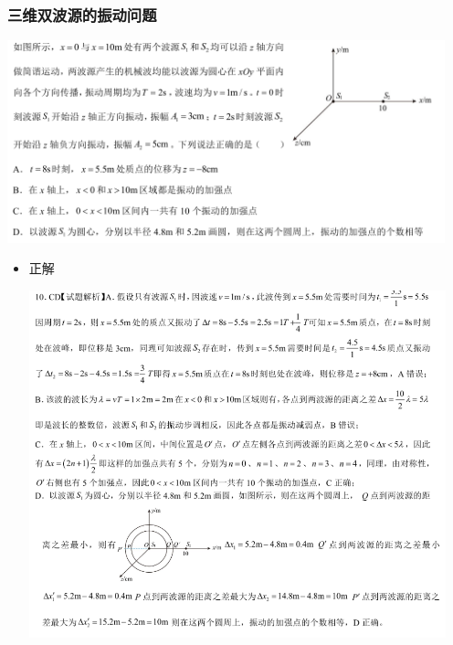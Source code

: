 \documentclass{article}
\begin{document}
\vspace{2em}

\subsubsection{三维双波源的振动问题}
\includegraphics[width=0.95\textwidth,keepaspectratio]{./pictures/3.14-5.png}

\begin{itemize}
    \item 正解
    
    \includegraphics[width=0.95\textwidth,keepaspectratio]{./pictures/3.14-6.png}

\end{itemize}
\end{document}
